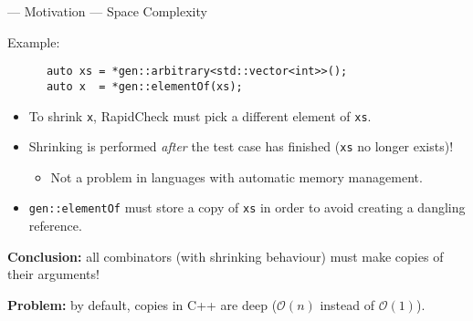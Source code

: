 \begin{frame}[fragile]{\halcheck{} --- Motivation --- Space Complexity}
  \begin{block}{Example:}
    \begin{verbatim}
      auto xs = *gen::arbitrary<std::vector<int>>();
      auto x  = *gen::elementOf(xs);
    \end{verbatim}
  \end{block}

  \pause{}

  \begin{itemize}
    \item To shrink \texttt{x}, RapidCheck must pick a different element of \texttt{xs}.
          \pause{}

    \item Shrinking is performed \emph{after} the test case has finished (\alert{\texttt{xs} no longer exists})!
          \begin{itemize}
            \item Not a problem in languages with automatic memory management.
          \end{itemize}
          \pause{}

    \item \texttt{gen::elementOf} must store a copy of \texttt{xs} in order to avoid creating a dangling reference.
          \pause{}
  \end{itemize}

  \textbf{Conclusion:} all combinators (with shrinking behaviour) must make copies of their arguments!

  \pause{}

  \textbf{Problem:} by default, copies in C++ are deep ($\mathcal{O}(n)$ instead of $\mathcal{O}(1)$).
\end{frame}

